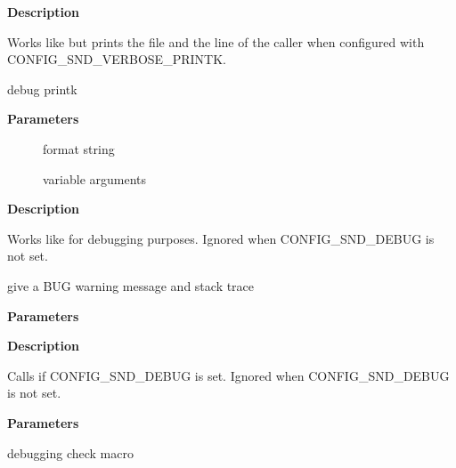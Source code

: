 \documentclass[a4paper,8pt,english]{sphinxmanual}
\begin{document}
\textbf{Description}

Works like  but prints the file and the line of the caller
when configured with CONFIG\_SND\_VERBOSE\_PRINTK.

\begin{fulllineitems}
\label{sound/kernel-api/alsa-driver-api:c.snd_printd}
debug printk

\end{fulllineitems}


\textbf{Parameters}
\begin{description}
\item[{}] \leavevmode
format string

\item[{}] \leavevmode
variable arguments

\end{description}

\textbf{Description}

Works like  for debugging purposes.
Ignored when CONFIG\_SND\_DEBUG is not set.

\begin{fulllineitems}
\label{sound/kernel-api/alsa-driver-api:c.snd_BUG}
give a BUG warning message and stack trace

\end{fulllineitems}


\textbf{Parameters}

\textbf{Description}

Calls  if CONFIG\_SND\_DEBUG is set.
Ignored when CONFIG\_SND\_DEBUG is not set.

\begin{fulllineitems}
\label{sound/kernel-api/alsa-driver-api:c.snd_printd_ratelimit}
\end{fulllineitems}


\textbf{Parameters}

\begin{fulllineitems}
\label{sound/kernel-api/alsa-driver-api:c.snd_BUG_ON}
debugging check macro

\end{fulllineitems}
\end{document}
